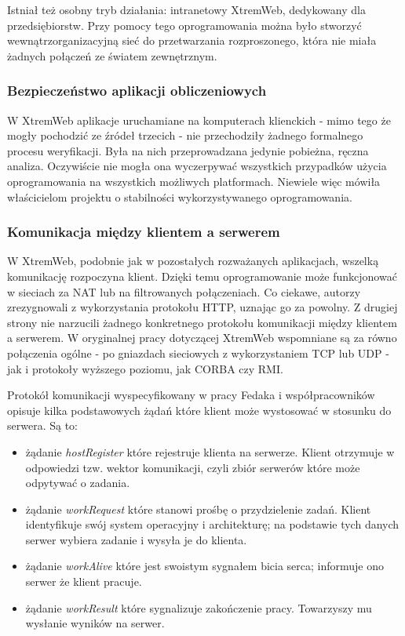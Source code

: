 \documentclass[12pt,a4paper,twoside]{article}
\begin{document}
Istniał też osobny tryb działania: intranetowy XtremWeb, dedykowany dla przedsiębiorstw. Przy pomocy tego oprogramowania można było stworzyć wewnątrzorganizacyjną sieć do przetwarzania rozproszonego, która nie miała żadnych połączeń ze światem zewnętrznym.

\subsubsection{Bezpieczeństwo aplikacji obliczeniowych}

W XtremWeb aplikacje uruchamiane na komputerach klienckich - mimo tego że mogły pochodzić ze źródeł trzecich - nie przechodziły żadnego formalnego procesu weryfikacji. Była na nich przeprowadzana jedynie pobieżna, ręczna analiza. Oczywiście nie mogła ona wyczerpywać wszystkich przypadków użycia oprogramowania na wszystkich możliwych platformach. Niewiele więc mówiła właścicielom projektu o stabilności wykorzystywanego oprogramowania.

\subsubsection{Komunikacja między klientem a serwerem}

W XtremWeb, podobnie jak w pozostałych rozważanych aplikacjach, wszelką komunikację rozpoczyna klient. Dzięki temu oprogramowanie może funkcjonować w sieciach za NAT lub na filtrowanych połączeniach. Co ciekawe, autorzy zrezygnowali z wykorzystania protokołu HTTP, uznając go za powolny. Z drugiej strony nie narzucili żadnego konkretnego protokołu komunikacji między klientem a serwerem. W oryginalnej pracy dotyczącej XtremWeb wspomniane są za równo połączenia ogólne - po gniazdach sieciowych z wykorzystaniem TCP lub UDP - jak i protokoły wyższego poziomu, jak CORBA czy RMI.

Protokół komunikacji wyspecyfikowany w pracy Fedaka i współpracowników opisuje kilka podstawowych żądań które klient może wystosować w stosunku do serwera. Są to:

\begin{itemize}
\item żądanie \textit{hostRegister} które rejestruje klienta na serwerze. Klient otrzymuje w odpowiedzi tzw. wektor komunikacji, czyli zbiór serwerów które może odpytywać o zadania.
\item żądanie \textit{workRequest} które stanowi prośbę o przydzielenie zadań. Klient identyfikuje swój system operacyjny i architekturę; na podstawie tych danych serwer wybiera zadanie i wysyła je do klienta.
\item żądanie \textit{workAlive} które jest swoistym sygnałem bicia serca; informuje ono serwer że klient pracuje.
\item żądanie \textit{workResult} które sygnalizuje zakończenie pracy. Towarzyszy mu wysłanie wyników na serwer.
\end{itemize}
\end{document}
